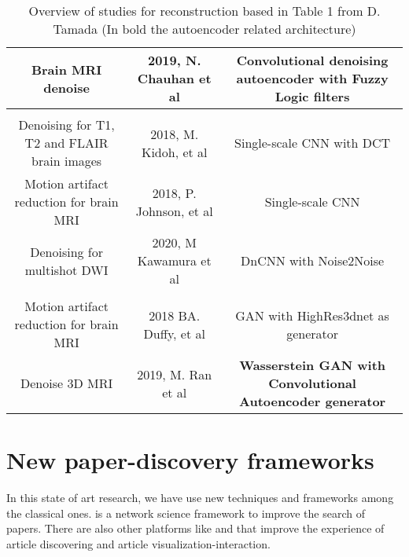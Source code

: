 \begin{table}[!ht]
\begin{tabularx}{\textwidth}{C C C}
        Brain MRI denoise & 2019, N. Chauhan et al \cite{fuzzyautoencoder} & \textbf{Convolutional denoising autoencoder with Fuzzy Logic filters} \\

        \hline
        \\
        \hline

        Denoising for T1, T2 and FLAIR brain images & 2018, M. Kidoh, et al \cite{kidoh2019scnnt1} & Single-scale CNN with DCT \\
        
        Motion artifact reduction for brain MRI & 2018, P. Johnson, et al \cite{scnnmotion} & Single-scale CNN\\
        
        Denoising for multishot DWI & 2020, M Kawamura et al \cite{dncnnnoise2noise} & DnCNN with Noise2Noise \\
        
        \hline
        \\
        \hline
        
        Motion artifact reduction for brain MRI & 2018 BA. Duffy, et al \cite{ganHR3d} & GAN with HighRes3dnet as generator \\
        
        Denoise 3D MRI & 2019, M. Ran et al \cite{wganautoencoder} & \textbf{Wasserstein GAN with Convolutional Autoencoder generator} \\
 
    \bottomrule
    \end{tabularx}
    \caption{Overview of studies for reconstruction based in Table 1 from D. Tamada \cite{tamada2020review} (In bold the autoencoder related architecture)}
    \label{table:paper_overview}
\end{table}
\FloatBarrier


\section{New paper-discovery frameworks}
\label{section:papers_discovery}

In this state of art research, we have use new techniques and frameworks among the classical ones.  is a network science framework to improve the search of papers. There are also other platforms like  and  that improve the experience of article discovering and article visualization-interaction.
 
